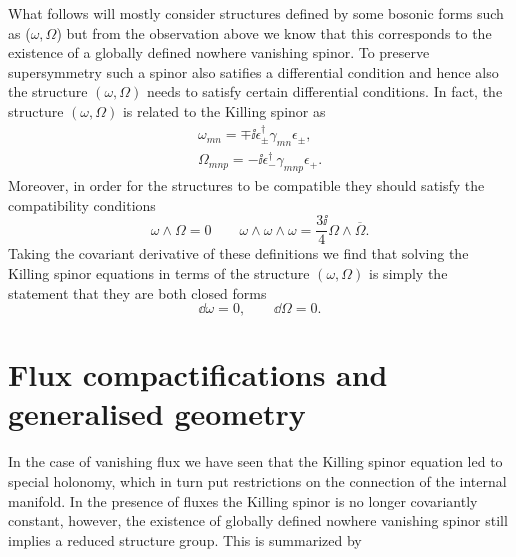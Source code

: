 What follows will mostly consider structures defined by some bosonic forms such as ($\omega,\Omega$) but from the observation above we know that this corresponds to the existence of a globally defined nowhere vanishing spinor. To preserve supersymmetry such a spinor also satifies a differential condition and hence also the structure $(\omega,\Omega)$ needs to satisfy certain differential conditions. In fact, the structure $(\omega,\Omega)$ is related to the Killing spinor as
\begin{align}
    \omega_{mn} = \mp\ii \epsilon^\dagger_\pm\gamma_{mn}\epsilon_\pm,\\
    \Omega_{mnp} = -\ii\epsilon^\dagger_-\gamma_{mnp}\epsilon_+.
\end{align}
Moreover, in order for the structures to be compatible they should satisfy the compatibility conditions 
\begin{equation}\label{eq:CompatibilityCalabiYau}
    \omega\wedge\Omega = 0\qquad \omega\wedge\omega\wedge\omega = \frac{3\ii}{4}\Omega\wedge\overbar{\Omega}.
\end{equation}
Taking the covariant derivative of these definitions we find that solving the Killing spinor equations in terms of the structure $(\omega,\Omega)$ is simply the statement that they are both closed forms 
\begin{equation}
    \dd \omega = 0, \qquad \dd \Omega = 0.
\end{equation}

\section{Flux compactifications and generalised geometry}
In the case of vanishing flux we have seen that the Killing spinor equation led to special holonomy, which in turn put restrictions on the connection of the internal manifold. In the presence of fluxes the Killing spinor is no longer covariantly constant, however, the existence of globally defined nowhere vanishing spinor still implies a reduced structure group. This is summarized by 

